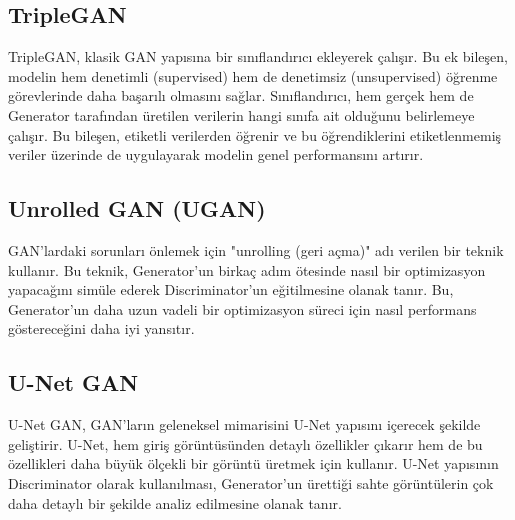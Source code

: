 \subsection{TripleGAN}

TripleGAN, klasik GAN yapısına bir sınıflandırıcı ekleyerek çalışır. Bu ek bileşen, modelin hem denetimli (supervised) hem de denetimsiz (unsupervised) öğrenme görevlerinde daha başarılı olmasını sağlar. Sınıflandırıcı, hem gerçek hem de Generator tarafından üretilen verilerin hangi sınıfa ait olduğunu belirlemeye çalışır. Bu bileşen, etiketli verilerden öğrenir ve bu öğrendiklerini etiketlenmemiş veriler üzerinde de uygulayarak modelin genel performansını artırır.

\subsection{Unrolled GAN (UGAN)}

GAN'lardaki sorunları önlemek için "unrolling (geri açma)" adı verilen bir teknik kullanır. Bu teknik, Generator'un birkaç adım ötesinde nasıl bir optimizasyon yapacağını simüle ederek Discriminator'un eğitilmesine olanak tanır. Bu, Generator'un daha uzun vadeli bir optimizasyon süreci için nasıl performans göstereceğini daha iyi yansıtır. 

\subsection{U-Net GAN}

U-Net GAN, GAN’ların geleneksel mimarisini U-Net yapısını içerecek şekilde geliştirir. U-Net, hem giriş görüntüsünden detaylı özellikler çıkarır hem de bu özellikleri daha büyük ölçekli bir görüntü üretmek için kullanır. U-Net yapısının Discriminator olarak kullanılması, Generator'un ürettiği sahte görüntülerin çok daha detaylı bir şekilde analiz edilmesine olanak tanır.

\newpage